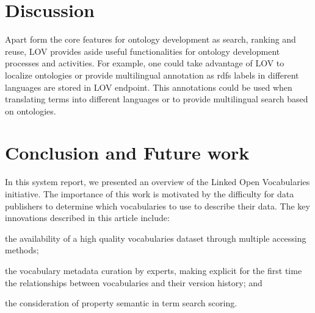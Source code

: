 \documentclass{iosart2c}
\begin{document}
\section{Discussion}

Apart form the core features for ontology development as search, ranking and reuse, LOV provides aside useful functionalities  for ontology development processes and activities. For example, one could take advantage of LOV to localize ontologies or provide multilingual annotation as rdfs labels in different languages are stored in LOV endpoint. This annotations could be used when translating terms into different languages or to provide multilingual search based on ontologies. 
		
%							
%   


\section{Conclusion and Future work}
\label{sec:conclusion}
In this system report, we presented an overview of the Linked Open Vocabularies initiative. The importance of this work is motivated by the difficulty for data publishers to determine which vocabularies to use to describe their data. The key innovations described in this article include: 
\begin{inparaenum}[1)] 
	\item the availability of a high quality vocabularies dataset through multiple accessing methods;
	\item the vocabulary metadata curation by experts, making explicit for the first time the relationships between vocabularies and their version history; and
	\item the consideration of property semantic in term search scoring.
\end{inparaenum}
\end{document}

